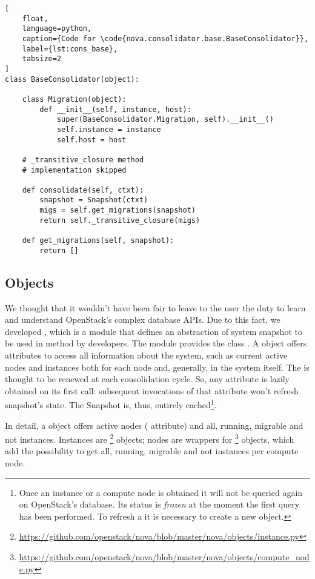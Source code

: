 \begin{lstlisting}[
	float,
	language=python,
	caption={Code for \code{nova.consolidator.base.BaseConsolidator}},
	label={lst:cons_base},
	tabsize=2
]
class BaseConsolidator(object):

	class Migration(object):
		def __init__(self, instance, host):
			super(BaseConsolidator.Migration, self).__init__()
			self.instance = instance
			self.host = host

	# _transitive_closure method
	# implementation skipped

	def consolidate(self, ctxt):
		snapshot = Snapshot(ctxt)
		migs = self.get_migrations(snapshot)
		return self._transitive_closure(migs)

	def get_migrations(self, snapshot):
		return []
\end{lstlisting}

\subsection{Objects}
\label{sub:cons_obj}
We thought that it wouldn't have been fair to leave to the user the duty to learn and understand OpenStack's complex database APIs.
Due to this fact, we developed , which is a module that defines an abstraction of system snapshot to be used in method  by developers. The module provides the class . A  object offers attributes to access all information about the system, such as current active nodes and instances both for each node and, generally, in the system itself. The  is thought to be renewed at each consolidation cycle. So, any attribute is lazily obtained on its first call: subsequent invocations of that attribute won't refresh snapshot's state. The Snapshot is, thus, entirely cached\footnote{Once an instance or a compute node is obtained it will not be queried again on OpenStack's database. Its status is \emph{frozen} at the moment the first query has been performed. To refresh a  it is necessary to create a new  object.}.

In detail, a  object offers active nodes ( attribute) and all, running, migrable and not instances. Instances are \footnote{\url{https://github.com/openstack/nova/blob/master/nova/objects/instance.py}} objects; nodes are wrappers for \footnote{\url{https://github.com/openstack/nova/blob/master/nova/objects/compute_node.py}} objects, which add the possibility to get all, running, migrable and not instances per compute node.

